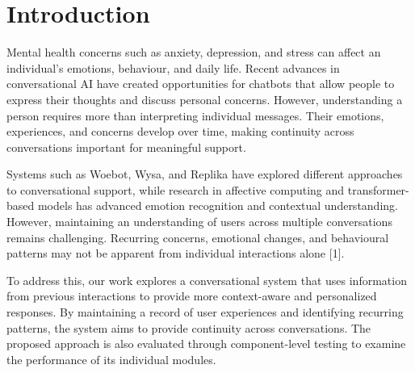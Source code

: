 \documentclass[conference]{IEEEtran}
\begin{document}
\section{Introduction}

Mental health concerns such as anxiety, depression, and stress can affect an individual's emotions, behaviour, and daily life. Recent advances in conversational AI have created opportunities for chatbots that allow people to express their thoughts and discuss personal concerns. However, understanding a person requires more than interpreting individual messages. Their emotions, experiences, and concerns develop over time, making continuity across conversations important for meaningful support.

Systems such as Woebot, Wysa, and Replika have explored different approaches to conversational support, while research in affective computing and transformer-based models has advanced emotion recognition and contextual understanding. However, maintaining an understanding of users across multiple conversations remains challenging. Recurring concerns, emotional changes, and behavioural patterns may not be apparent from individual interactions alone [1].

To address this, our work explores a conversational system that uses information from previous interactions to provide more context-aware and personalized responses. By maintaining a record of user experiences and identifying recurring patterns, the system aims to provide continuity across conversations. The proposed approach is also evaluated through component-level testing to examine the performance of its individual modules.
\end{document}
